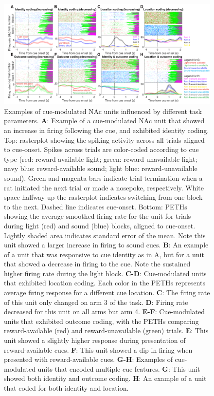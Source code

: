 \documentclass[11pt]{article}
\newcommand{\bsf}[1]{\textbf{#1}}
\begin{document}
 \begin{figure}[ht!]
\centering
\includegraphics[width=\textwidth]{Fig 4 - Neural examples.pdf}
\caption{Examples of cue-modulated NAc units influenced by different task parameters. \bsf{A}: Example of a cue-modulated NAc unit that showed an increase in firing following the cue, and exhibited identity coding. Top: rasterplot showing the spiking activity across all trials aligned to cue-onset. Spikes across trials are color-coded according to cue type (red: reward-available light; green: reward-unavailable light; navy blue: reward-available sound; light blue: reward-unavailable sound). Green and magenta bars indicate trial termination when a rat initiated the next trial or made a nosepoke, respectively. White space halfway up the rasterplot indicates switching from one block to the next. Dashed line indicates cue-onset. Bottom: PETHs showing the average smoothed firing rate for the unit for trials during light (red) and sound (blue) blocks, aligned to cue-onset. Lightly shaded area indicates standard error of the mean. Note this unit showed a larger increase in firing to sound cues. \bsf{B}: An example of a unit that was responsive to cue identity as in A, but for a unit that showed a decrease in firing to the cue. Note the sustained higher firing rate during the light block. \bsf{C-D}: Cue-modulated units that exhibited location coding. Each color in the PETHs represents average firing response for a different cue location. \bsf{C}: The firing rate of this unit only changed on arm 3 of the task. \bsf{D}: Firing rate decreased for this unit on all arms but arm 4. \bsf{E-F}: Cue-modulated units that exhibited outcome coding, with the PETHs comparing reward-available (red) and reward-unavailable (green) trials. \bsf{E}: This unit showed a slightly higher response during presentation of reward-available cues. \bsf{F}: This unit showed a dip in firing when presented with reward-available cues. \bsf{G-H}: Examples of cue-modulated units that encoded multiple cue features. \bsf{G}: This unit showed both identity and outcome coding. \bsf{H}: An example of a unit that coded for both identity and location.}
\label{fig:examples}
\end{figure} \clearpage
\end{document}
